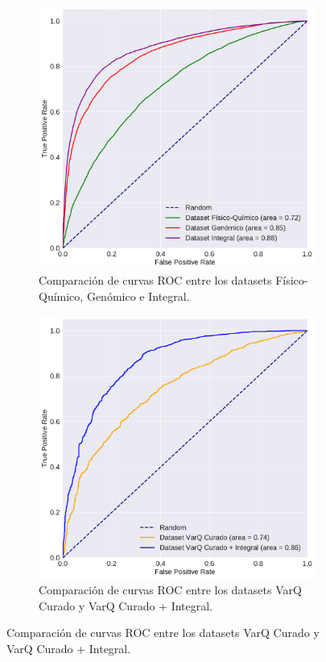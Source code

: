 \begin{figure}[H]
\centering
\begin{subfigure}[b]{0.6\textwidth}
    \centering
    \includegraphics[width=\textwidth]{documents/latex/figures/4/curvas_auc_humsavar.pdf}
    \caption{Comparación de curvas ROC entre los datasets Físico-Químico, Genómico e Integral.}
    \label{fig:curvas_auc_humsavar}
\end{subfigure}

\hfill
\hfill

\begin{subfigure}[b]{0.6\textwidth}
    \centering
    \includegraphics[width=\textwidth]{documents/latex/figures/4/curvas_auc_varq.pdf}
    \caption{Comparación de curvas ROC entre los datasets VarQ Curado y VarQ Curado + Integral.}
    \label{fig:curvas_auc_varq}
\end{subfigure}

\end{figure}


